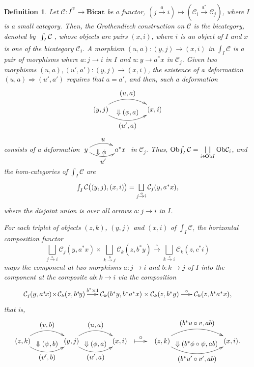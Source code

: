 \documentclass[]{amsart}
\newtheorem{definition}[theorem]{Definition}
\begin{document}
\begin{definition}Let ${\ensuremath{\mathcal{C}}}:I^{^{\mathrm{op}}}\to {\ensuremath{\mathbf{Bicat}}}$ be a functor, $(j\overset{a}\to i)\mapsto   ({\ensuremath{\mathcal{C}}}_i\overset{a^*}\to {\ensuremath{\mathcal{C}}}_j)$, where $I$ is a small category. Then, the Grothendieck construction on ${\ensuremath{\mathcal{C}}}$ is  the bicategory, denoted by $\xymatrix{\int_I{\ensuremath{\mathcal{C}}}}$, whose objects are pairs $(x,i)$, where $i$ is an object of $I$ and $x$ is one of the bicategory ${\ensuremath{\mathcal{C}}}_i$. A morphism $(u,a):(y,j)\to (x,i)$ in $\int_I{\ensuremath{\mathcal{C}}}$ is a pair of morphisms where $a:j\to i$ in $I$ and $u:y\to a^*x$ in ${\ensuremath{\mathcal{C}}}_j$. Given two morphisms $(u,a),(u',a'):(y,j)\to(x,i)$, the existence of a  deformation $(u,a)\Rightarrow (u',a')$ requires that $a=a'$,  and then, such a deformation
$$\xymatrix@C=6pt{(y,j)  \ar@/^1.3pc/[rr]^{\textstyle (u,a)} \ar@/_1.3pc/[rr]_{\textstyle (u',a)} & {}_{\textstyle \Downarrow(\phi,a)} &(x,i) }  $$ consists of a deformation  $\xymatrix @C=0.5pc {y  \ar@/^0.8pc/[rr]^{\textstyle u} \ar@/_0.8pc/[rr]_{\textstyle u'} & {}_{\textstyle\Downarrow\phi} &a^*x }$ in ${\ensuremath{\mathcal{C}}}_j$. Thus,
$\mbox{Ob}\!\int_I{\ensuremath{\mathcal{C}}}=\bigsqcup\limits_{i\in \!\mbox{\scriptsize Ob}I}\mbox{Ob}{\ensuremath{\mathcal{C}}}_i$, and the
hom-categories of $\int_I{\ensuremath{\mathcal{C}}}$ are
$$\xymatrix{\int_I{\ensuremath{\mathcal{C}}}\big((y,j),(x,i)\big)=\bigsqcup\limits_{j\overset{a}\to i}{\ensuremath{\mathcal{C}}}_j(y,a^*x),}$$
where the disjoint union is over all arrows $a:j\to i$ in $I$.

For each triplet of objects $(z,k)$, $(y,j)$ and $(x,i)$ of $\int_I{\ensuremath{\mathcal{C}}}$, the horizontal composition
functor
$$\bigsqcup\limits_{j\overset{a}\to i}{\ensuremath{\mathcal{C}}}_j(y,a^*x) \times \bigsqcup\limits_{k\overset{b}\to j}{\ensuremath{\mathcal{C}}}_k(z,b^*y) \overset{\circ}\longrightarrow
\bigsqcup\limits_{k\overset{c}\to i}{\ensuremath{\mathcal{C}}}_k(z,c^*i)$$ maps the component at two morphisms $a:j\to i$
and $b:k\to j$ of $I$ into the component at the composite $ab:k\to i$ via the composition
$$\xymatrix@C=16pt{{\ensuremath{\mathcal{C}}}_j(y,a^*\!x)\!\times\! {\ensuremath{\mathcal{C}}}_k(z,b^*\!y) \ar[r]^-{b^*\times 1} &
{\ensuremath{\mathcal{C}}}_k(b^*y,b^*a^*x)\times {\ensuremath{\mathcal{C}}}_k(z,b^*y)\ar[r]^-{\circ}&{\ensuremath{\mathcal{C}}}_k(z,b^*a^*x), }$$that is,
$$\xymatrix@C=2pt{(z,k)  \ar@/^1.3pc/[rr]^{\textstyle (v,b)} \ar@/_1.3pc/[rr]_{\textstyle (v',b)} & {}_{\textstyle \Downarrow(\psi,b)} &(y,j)  \ar@/^1.3pc/[rr]^{\textstyle (u,a)} \ar@/_1.3pc/[rr]_{\textstyle (u',a)} & {}_{\textstyle \Downarrow(\phi,a)} &(x,i)&\ar@{|->}[rrr]^-{\textstyle \circ} && &&(z,k) \ar@/^1.5pc/[rr]^{\textstyle (b^*u\circ v,ab)} \ar@/_1.5pc/[rr]_{\textstyle (b^*u'\circ v',ab)}&{}_{\textstyle \Downarrow(b^*\phi\circ\psi,ab)}& (x,i).  }  $$


\end{definition}
\end{document}

